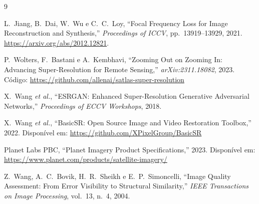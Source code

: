 \documentclass[12pt, a4paper]{article}
\begin{document}
\begin{thebibliography}{9}

    L.\ Jiang, B.\ Dai, W.\ Wu e C.\ C.\ Loy,
    ``Focal Frequency Loss for Image Reconstruction and Synthesis,''
    \textit{Proceedings of ICCV}, pp.~13919--13929, 2021.
    \url{https://arxiv.org/abs/2012.12821}.

    P.\ Wolters, F.\ Bastani e A.\ Kembhavi,
    ``Zooming Out on Zooming In: Advancing Super-Resolution for Remote Sensing,''
    \textit{arXiv:2311.18082}, 2023.
    Código: \url{https://github.com/allenai/satlas-super-resolution}

    X.\ Wang \textit{et al.},
    ``ESRGAN: Enhanced Super-Resolution Generative Adversarial Networks,''
    \textit{Proceedings of ECCV Workshops}, 2018.

    X.\ Wang \textit{et al.},
    ``BasicSR: Open Source Image and Video Restoration Toolbox,''
    2022. Disponível em: \url{https://github.com/XPixelGroup/BasicSR}

    Planet Labs PBC,
    ``Planet Imagery Product Specifications,'' 2023.
    Disponível em: \url{https://www.planet.com/products/satellite-imagery/}

    Z.\ Wang, A.\ C.\ Bovik, H.\ R.\ Sheikh e E.\ P.\ Simoncelli,
    ``Image Quality Assessment: From Error Visibility to Structural Similarity,''
    \textit{IEEE Transactions on Image Processing}, vol.\ 13, n.\ 4, 2004.

\end{thebibliography}
\end{document}
